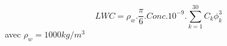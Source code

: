 \[
LWC = \rho_w .\frac{\pi}{6}. Conc .10^{-9}.
      \sum_{k=1}^{30} C_k \phi^3_k
\]
avec $\rho_w = 1000 kg/m^3$
